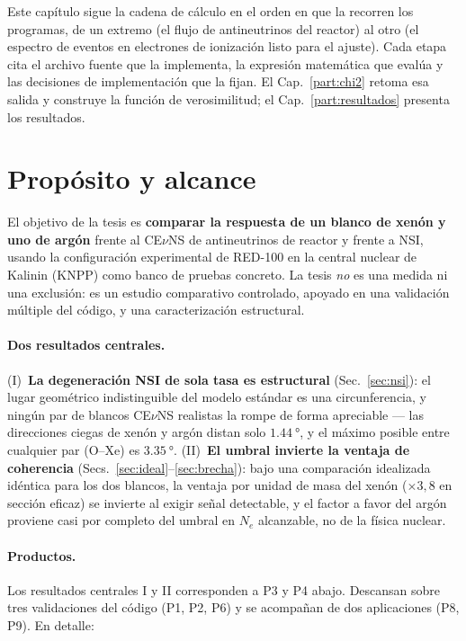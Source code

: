 \documentclass[11pt,a4paper]{article}
\newcommand{\Ne}{N_{e}}
\begin{document}
Este cap\'itulo sigue la cadena de c\'alculo en el orden en que la recorren los
programas, de un extremo (el flujo de antineutrinos del reactor) al otro (el
espectro de eventos en electrones de ionizaci\'on listo para el ajuste). Cada
etapa cita el archivo fuente que la implementa, la expresi\'on matem\'atica que
eval\'ua y las decisiones de implementaci\'on que la fijan. El
Cap.~\ref{part:chi2} retoma esa salida y construye la funci\'on de verosimilitud;
el Cap.~\ref{part:resultados} presenta los resultados.

\section{Prop\'osito y alcance}
\label{sec:proposito}

El objetivo de la tesis es \textbf{comparar la respuesta de un blanco de xen\'on
y uno de arg\'on} frente al CE$\nu$NS de antineutrinos de reactor y frente a
NSI, usando la configuraci\'on experimental de RED-100 en la central nuclear de
Kalinin (KNPP) como banco de pruebas concreto. La tesis \emph{no} es una medida
ni una exclusi\'on: es un estudio comparativo controlado, apoyado en una
validaci\'on m\'ultiple del c\'odigo, y una caracterizaci\'on estructural.

\paragraph{Dos resultados centrales.} (I)~\textbf{La degeneraci\'on NSI de sola
tasa es estructural} (Sec.~\ref{sec:nsi}): el lugar geom\'etrico indistinguible
del modelo est\'andar es una circunferencia, y ning\'un par de blancos CE$\nu$NS
realistas la rompe de forma apreciable --- las direcciones ciegas de xen\'on y
arg\'on distan solo $\SI{1.44}{\degree}$, y el m\'aximo posible entre cualquier
par (O--Xe) es $\SI{3.35}{\degree}$. (II)~\textbf{El umbral invierte la ventaja
de coherencia} (Secs.~\ref{sec:ideal}--\ref{sec:brecha}): bajo una comparaci\'on
idealizada id\'entica para los dos blancos, la ventaja por unidad de masa del
xen\'on ($\times3{,}8$ en secci\'on eficaz) se invierte al exigir se\~nal
detectable, y el factor a favor del arg\'on proviene casi por completo del umbral
en $\Ne$ alcanzable, no de la f\'isica nuclear.

\paragraph{Productos.} Los resultados centrales I y II corresponden a P3 y P4
abajo. Descansan sobre tres validaciones del c\'odigo (P1, P2, P6) y se
acompa\~nan de dos aplicaciones (P8, P9). En detalle:
\end{document}
